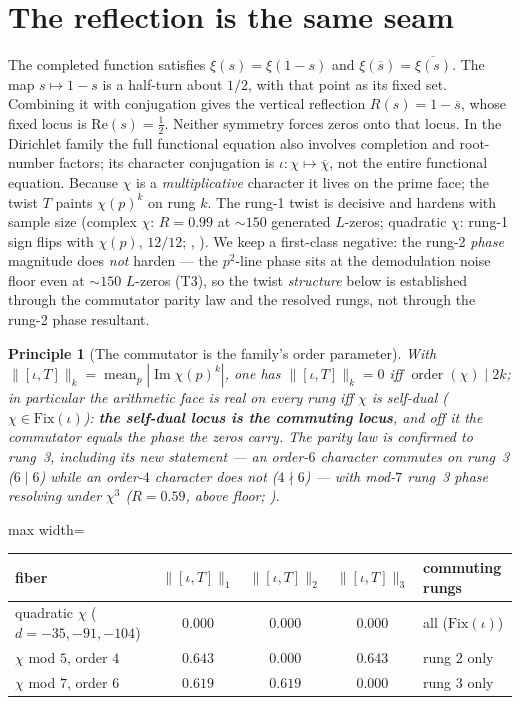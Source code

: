 \documentclass[11pt]{article}
\theoremstyle{definition}
\theoremstyle{plain}
\newtheorem{principle}{Principle}
\newcommand{\zbar}{\overline{\chi}}
\newcommand{\half}{\tfrac12}
\begin{document}
\section{The reflection is the same seam}\label{sec:reflect}

The completed function satisfies $\xi(s)=\xi(1-s)$ and
$\xi(\overline{s})=\overline{\xi(s)}$. The map $s\mapsto1-s$ is a
half-turn about $1/2$, with that point as its fixed set. Combining it with
conjugation gives the vertical reflection $R(s)=1-\overline{s}$, whose
fixed locus is Re$(s)=\half$. Neither symmetry forces zeros onto that locus.
In the Dirichlet family the full functional equation also involves completion
and root-number factors; its character conjugation is $\iota:\chi\mapsto\zbar$,
not the entire functional equation. Because $\chi$ is a \emph{multiplicative} character it lives
on the prime face; the twist $T$ paints $\chi(p)^k$ on rung $k$. The rung-1 twist is decisive
and hardens with sample size (complex $\chi$: $R=0.99$ at $\sim\!150$ generated $L$-zeros;
quadratic $\chi$: rung-1 sign flips with $\chi(p)$, $12/12$;
, ). We keep a first-class
negative: the rung-2 \emph{phase} magnitude does \emph{not} harden --- the $p^2$-line phase sits
at the demodulation noise floor even at $\sim\!150$ $L$-zeros (T3), so the twist \emph{structure}
below is established through the commutator parity law and the resolved rungs, not through the
rung-2 phase resultant.

\begin{principle}[The commutator is the family's order parameter]\label{prin:comm}
With $\|[\iota,T]\|_k=\operatorname*{mean}_p|\operatorname{Im}\chi(p)^k|$, one has
$\|[\iota,T]\|_k=0$ iff $\operatorname{order}(\chi)\mid 2k$; in particular the arithmetic face is
real on every rung iff $\chi$ is self-dual ($\chi\in\mathrm{Fix}(\iota)$): \textbf{the self-dual
locus is the commuting locus}, and off it the commutator equals the phase the zeros carry. The
parity law is confirmed to rung~3, including its new statement --- an order-$6$ character commutes
on rung~3 ($6\mid 6$) while an order-$4$ character does not ($4\nmid 6$) --- with mod-$7$ rung~3
phase resolving under $\chi^3$ ($R=0.59$, above floor; ).
\end{principle}

\begin{center}\small
\begin{adjustbox}{max width=\linewidth}\begin{tabular}{@{}lcccl@{}}
\toprule
fiber & $\|[\iota,T]\|_{1}$ & $\|[\iota,T]\|_{2}$ & $\|[\iota,T]\|_{3}$ & commuting rungs \\
\midrule
quadratic $\chi$ ($d=-35,-91,-104$) & $0.000$ & $0.000$ & $0.000$ & all ($\mathrm{Fix}(\iota)$) \\
$\chi$ mod $5$, order $4$ & $0.643$ & $0.000$ & $0.643$ & rung $2$ only \\
$\chi$ mod $7$, order $6$ & $0.619$ & $0.619$ & $0.000$ & rung $3$ only \\
\bottomrule
\end{tabular}\end{adjustbox}
\end{center}
\end{document}

